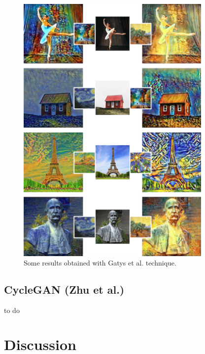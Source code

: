 \documentclass[twocolumn,superscriptaddress,aps, floatfix]{revtex4-1}
\begin{document}
    \begin{figure}[ht]
        \centering
        \includegraphics[width=0.85\textwidth]{resources/png/gatys-final.png}
        \caption{Some results obtained with Gatys et al. technique.}
        \label{fig:final.results.gatys}
    \end{figure}
    
    \subsection{CycleGAN (Zhu et al.)}\label{sec:results.zhu}
    
    to do
    
    
    
    
    \section{Discussion}\label{sec:discussion}
    
\end{document}

